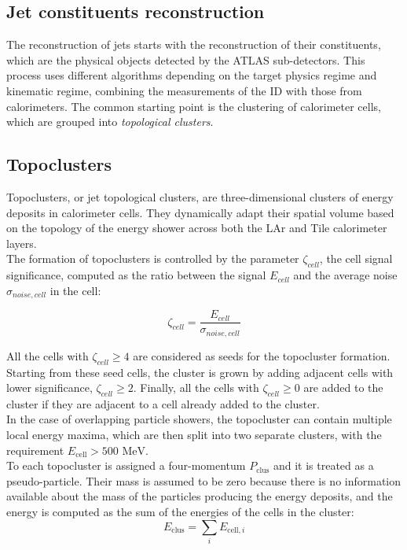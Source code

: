 \subsection{Jet constituents reconstruction}\label{sec:Reco/Jets/Components}
The reconstruction of jets starts with the reconstruction of their constituents, which are the physical objects detected by the ATLAS sub-detectors.
This process uses different algorithms depending on the target physics regime and kinematic regime, combining the measurements of the ID with those from calorimeters.
The common starting point is the clustering of calorimeter cells, which are grouped into \textit{topological clusters}.

\subsection*{Topoclusters}\label{sec:Reco/Jets/Components/Topoclusters}
Topoclusters, or jet topological clusters, are three-dimensional clusters of energy deposits in calorimeter cells.
They  dynamically adapt their spatial volume based on the topology of the energy shower across both the LAr and Tile calorimeter layers.\\
The formation of topoclusters is controlled by the parameter $\zeta_{cell}$, the cell signal significance\cite{ATLAS_topoclusters}, computed as the ratio between the signal $E_{cell}$ and the average noise $\sigma_{noise,cell}$ in the cell:

\begin{equation}\label{eq:Reco/Jets/Components/Topoclusters/zeta_cell}
\zeta_{cell} =  \frac{E_{cell}}{\sigma_{noise, cell}}
\end{equation}

\noindent All the cells with $\zeta_{cell} \ge 4$ are considered as seeds for the topocluster formation.
Starting from these seed cells, the cluster is grown by adding adjacent cells with lower significance, $ \zeta_{cell} \ge 2$. 
Finally, all the cells with $ \zeta_{cell} \ge 0$ are added to the cluster if they are adjacent to a cell already added to the cluster.\\
In the case of overlapping particle showers, the topocluster can contain multiple local energy maxima, which are then split into two separate clusters, with the requirement $E_{\text{cell}} > 500\text{ MeV}$.\\
To each topocluster is assigned a four-momentum $P_{\text{clus}}$ and it is treated as a pseudo-particle. Their mass is assumed to be zero because there is no information available about the mass of the particles producing the energy deposits, and the energy is computed as the sum of the energies of the cells in the cluster:
\begin{equation}\label{eq:Reco/Jets/Components/Topoclusters/Eclus}
E_{\text{clus}} = \sum_{i} E_{\text{cell}, i}
\end{equation}

